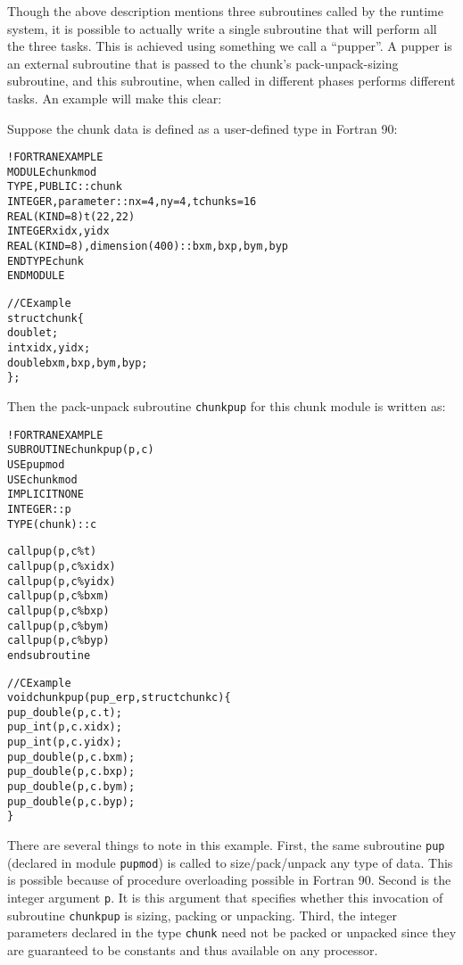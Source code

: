 \documentclass[10pt]{article}
\begin{document}
Though the above description mentions three subroutines called by the \ampi{}
runtime system, it is possible to actually write a single subroutine that will
perform all the three tasks. This is achieved using something we call a
``pupper''. A pupper is an external subroutine that is passed to the chunk's
pack-unpack-sizing subroutine, and this subroutine, when called in different
phases performs different tasks. An example will make this clear:

Suppose the chunk data is defined as a user-defined type in Fortran 90:

\begin{alltt}
!FORTRAN EXAMPLE
MODULE chunkmod
  TYPE, PUBLIC :: chunk
      INTEGER , parameter :: nx=4, ny=4, tchunks=16
      REAL(KIND=8) t(22,22)
      INTEGER xidx, yidx
      REAL(KIND=8), dimension(400):: bxm, bxp, bym, byp
  END TYPE chunk
END MODULE

//C Example
struct chunk\{
  double t;
  int xidx, yidx;
  double bxm,bxp,bym,byp;
\};
\end{alltt}

Then the pack-unpack subroutine \texttt{chunkpup} for this chunk module is
written as:

\begin{alltt}
!FORTRAN EXAMPLE
SUBROUTINE chunkpup(p, c)
  USE pupmod
  USE chunkmod
  IMPLICIT NONE
  INTEGER :: p
  TYPE(chunk) :: c

  call pup(p, c\%t)
  call pup(p, c\%xidx)
  call pup(p, c\%yidx)
  call pup(p, c\%bxm)
  call pup(p, c\%bxp)
  call pup(p, c\%bym)
  call pup(p, c\%byp)
end subroutine

//C Example
void chunkpup(pup_er p, struct chunk c)\{
  pup_double(p,c.t);
  pup_int(p,c.xidx);
  pup_int(p,c.yidx);
  pup_double(p,c.bxm);
  pup_double(p,c.bxp);
  pup_double(p,c.bym);
  pup_double(p,c.byp);
\}
\end{alltt}

There are several things to note in this example. First, the same subroutine
\texttt{pup} (declared in module \texttt{pupmod}) is called to size/pack/unpack
any type of data. This is possible because of procedure overloading possible in
Fortran 90. Second is the integer argument \texttt{p}. It is this argument that
specifies whether this invocation of subroutine \texttt{chunkpup} is sizing,
packing or unpacking. Third, the integer parameters declared in the type
\texttt{chunk} need not be packed or unpacked since they are guaranteed to be
constants and thus available on any processor.
\end{document}
